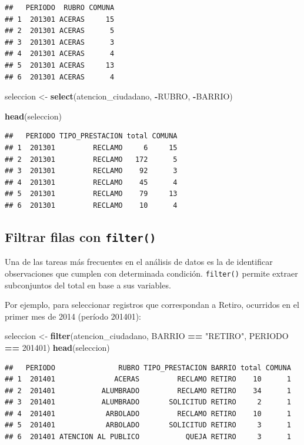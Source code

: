 \documentclass[]{book}
\newenvironment{Shaded}{\begin{snugshade}}{\end{snugshade}}
\newcommand{\KeywordTok}[1]{\textcolor[rgb]{0.13,0.29,0.53}{\textbf{#1}}}
\newcommand{\DecValTok}[1]{\textcolor[rgb]{0.00,0.00,0.81}{#1}}
\newcommand{\StringTok}[1]{\textcolor[rgb]{0.31,0.60,0.02}{#1}}
\newcommand{\OperatorTok}[1]{\textcolor[rgb]{0.81,0.36,0.00}{\textbf{#1}}}
\newcommand{\NormalTok}[1]{#1}
\begin{document}
\begin{verbatim}
##   PERIODO  RUBRO COMUNA
## 1  201301 ACERAS     15
## 2  201301 ACERAS      5
## 3  201301 ACERAS      3
## 4  201301 ACERAS      4
## 5  201301 ACERAS     13
## 6  201301 ACERAS      4
\end{verbatim}

\begin{Shaded}
\begin{Highlighting}[]
\NormalTok{seleccion <-}\StringTok{ }\KeywordTok{select}\NormalTok{(atencion_ciudadano, }\OperatorTok{-}\NormalTok{RUBRO, }\OperatorTok{-}\NormalTok{BARRIO)}

\KeywordTok{head}\NormalTok{(seleccion)}
\end{Highlighting}
\end{Shaded}

\begin{verbatim}
##   PERIODO TIPO_PRESTACION total COMUNA
## 1  201301         RECLAMO     6     15
## 2  201301         RECLAMO   172      5
## 3  201301         RECLAMO    92      3
## 4  201301         RECLAMO    45      4
## 5  201301         RECLAMO    79     13
## 6  201301         RECLAMO    10      4
\end{verbatim}

\subsection{\texorpdfstring{Filtrar filas con
\texttt{filter()}}{Filtrar filas con filter()}}\label{filtrar-filas-con-filter}

Una de las tareas más frecuentes en el análisis de datos es la de
identificar observaciones que cumplen con determinada condición.
\texttt{filter()} permite extraer subconjuntos del total en base a sus
variables.

Por ejemplo, para seleccionar registros que correspondan a Retiro,
ocurridos en el primer mes de 2014 (período 201401):

\begin{Shaded}
\begin{Highlighting}[]
\NormalTok{seleccion <-}\StringTok{ }\KeywordTok{filter}\NormalTok{(atencion_ciudadano, BARRIO }\OperatorTok{==}\StringTok{ "RETIRO"}\NormalTok{, PERIODO }\OperatorTok{==}\StringTok{ }\DecValTok{201401}\NormalTok{)}
\KeywordTok{head}\NormalTok{(seleccion)}
\end{Highlighting}
\end{Shaded}

\begin{verbatim}
##   PERIODO               RUBRO TIPO_PRESTACION BARRIO total COMUNA
## 1  201401              ACERAS         RECLAMO RETIRO    10      1
## 2  201401           ALUMBRADO         RECLAMO RETIRO    34      1
## 3  201401           ALUMBRADO       SOLICITUD RETIRO     2      1
## 4  201401            ARBOLADO         RECLAMO RETIRO    10      1
## 5  201401            ARBOLADO       SOLICITUD RETIRO     3      1
## 6  201401 ATENCION AL PUBLICO           QUEJA RETIRO     3      1
\end{verbatim}
\end{document}
